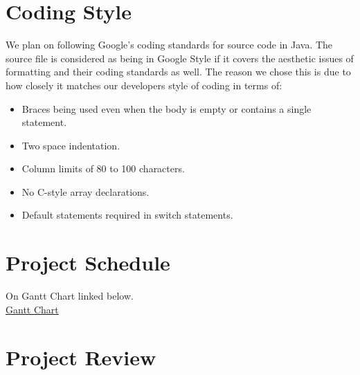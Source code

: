 \documentclass{article}
\begin{document}
\section{Coding Style}
We plan on following Google's coding standards for source code in Java. The source file is considered as being in Google Style if it covers the  aesthetic issues of formatting and their coding standards as well. The reason we chose this is due to how closely it matches our developers style of coding in terms of:

\begin{itemize}
	\item Braces being used even when the body is empty or contains a single statement.
	\item Two space indentation.
	\item Column limits of 80 to 100 characters.
	\item No C-style array declarations.
	\item Default statements required in switch statements.
\end{itemize}

\section{Project Schedule}
On Gantt Chart linked below.\\
\href{https://gitlab.cas.mcmaster.ca/dimitn/image_processing_app/blob/master/ProjectSchedule/3XA3Gantt.pdf}{Gantt Chart}

\section{Project Review}
\end{document}
